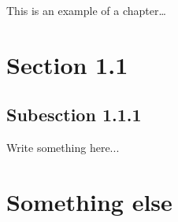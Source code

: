 This is an example of a chapter\dots

\section{Section 1.1}
\subsection{Subesction 1.1.1}
Write something here...

\section{Something else}